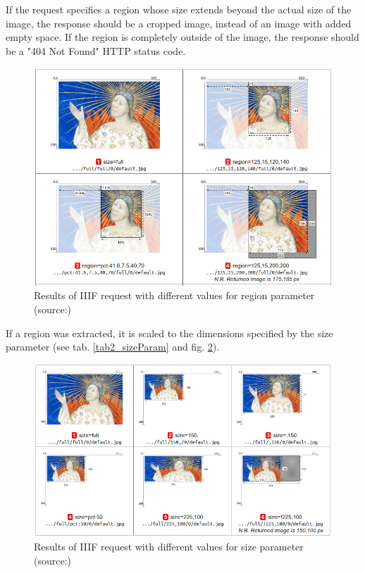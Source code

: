 If the request specifies a region whose size extends beyond the actual size of the image, the response should be a cropped image, instead of an image with added empty space. If the region is completely outside of the image, the response should be a "404 Not Found" HTTP status code\cite{web:iiif}.

\begin{figure}[H]
	\begin{center}
		\includegraphics[scale=0.4]{img/region_param.png}
		\caption{Results of IIIF request with different values for region parameter (source:\cite{web:iiif})}
		\label{fig2_iiifRegion}
	\end{center}
\end{figure}

If a region was extracted, it is scaled to the dimensions specified by the size parameter (see tab. \ref{tab2_sizeParam} and fig. \ref{fig2_iiifSize}).

\begin{figure}[H]
	\begin{center}
		\includegraphics[scale=0.35]{img/size_parameter.png}
		\caption{Results of IIIF request with different values for size parameter (source:\cite{web:iiif})}
		\label{fig2_iiifSize}
	\end{center}
\end{figure}

